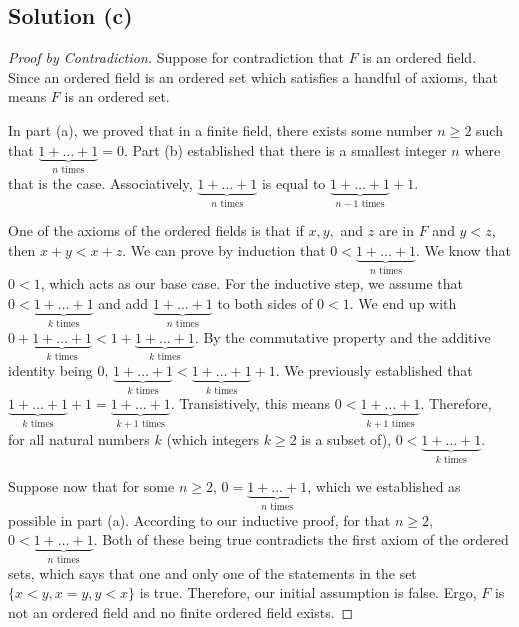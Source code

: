 \documentclass[11pt]{article}
\begin{document}
    \subsection{Solution (c)}
    \begin{proof}[Proof by Contradiction]
        Suppose for contradiction that $F$ is an ordered field.
        Since an ordered field is an ordered set which satisfies a handful of axioms, that means $F$ is an ordered set.

        In part (a), we proved that in a finite field, there exists some number $n \geq 2$ such that $\underbrace{1 + \dots + 1}_{n \text{ times}} = 0$.
        Part (b) established that there is a smallest integer $n$ where that is the case.
        Associatively, $\underbrace{1 + \dots + 1}_{n \text{ times}}$ is equal to $\underbrace{1 + \dots + 1}_{n - 1 \text{ times}} + 1$.

        One of the axioms of the ordered fields is that if $x, y,$ and $z$ are in $F$ and $y < z$, then $x + y < x + z$.
        We can prove by induction that $0 < \underbrace{1 + \dots + 1}_{n \text{ times}}$.
        We know that $0 < 1$, which acts as our base case.
        For the inductive step, we assume that $0 < \underbrace{1 + \dots + 1}_{k \text{ times}}$ and add $\underbrace{1 + \dots + 1}_{n \text{ times}}$ to both sides of $0 < 1$.
        We end up with $0 + \underbrace{1 + \dots + 1}_{k \text{ times}} < 1 + \underbrace{1 + \dots + 1}_{k \text{ times}}$.
        By the commutative property and the additive identity being $0$, $\underbrace{1 + \dots + 1}_{k \text{ times}} < \underbrace{1 + \dots + 1}_{k \text{ times}} + 1$.
        We previously established that $\underbrace{1 + \dots + 1}_{k \text{ times}} + 1 = \underbrace{1 + \dots + 1}_{k + 1 \text{ times}}$.
        Transistively, this means $0 < \underbrace{1 + \dots + 1}_{k + 1 \text{ times}}$.
        Therefore, for all natural numbers $k$ (which integers $k \geq 2$ is a subset of), $0 < \underbrace{1 + \dots + 1}_{k \text{ times}}$.

        Suppose now that for some $n \geq 2$, $0 = \underbrace{1 + \dots + 1}_{n \text{ times}}$, which we established as possible in part (a).
        According to our inductive proof, for that $n \geq 2$, $0 < \underbrace{1 + \dots + 1}_{n \text{ times}}$.
        Both of these being true contradicts the first axiom of the ordered sets, which says that one and only one of the statements in the set $\{x < y, x = y, y < x\}$ is true.
        Therefore, our initial assumption is false.
        Ergo, $F$ is not an ordered field and no finite ordered field exists.
    \end{proof}
\end{document}
